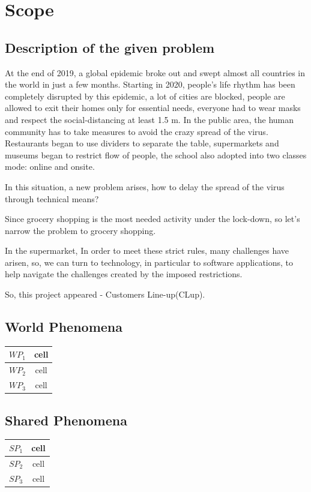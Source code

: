 \documentclass[a4paper,12pt]{report}
\begin{document}
\section{Scope}
\subsection{Description of the given problem}

At the end of 2019, a global epidemic broke out and swept almost all countries in the world in just a few months. Starting in 2020, people's life rhythm has been completely disrupted by this epidemic, a lot of cities are blocked, people are allowed to exit their homes only for essential needs, everyone had to wear masks and respect the social-distancing at least 1.5 m. In the public area, the human community has to take measures to avoid the crazy spread of the virus. Restaurants began to use dividers to separate the table, supermarkets and museums began to restrict flow of people, the school also adopted into two classes mode: online and onsite.

In this situation, a new problem arises, how to delay the spread of the virus through technical means? 

Since grocery shopping is the most needed activity under the lock-down, so let’s narrow the problem to grocery shopping.

In the supermarket, In order to meet these strict rules, many challenges have arisen, so, we can turn to technology, in particular to software applications, to help navigate the challenges created by the imposed restrictions.

So, this project appeared - Customers Line-up(CLup).

\subsection{World Phenomena}

\begin{center}
	\begin{tabular}{ c|c } 
		\hline
		$WP_1$ & cell \\ 
		\hline
		$WP_2$ & cell \\ 
		\hline
		$WP_3$ & cell \\ 
		\hline
	\end{tabular}
\end{center}

\subsection{Shared Phenomena}
\begin{center}
	\begin{tabular}{ c|c } 
		\hline
		$SP_1$ & cell \\ 
		\hline
		$SP_2$ & cell \\ 
		\hline
		$SP_3$ & cell \\ 
		\hline
	\end{tabular}
\end{center}
\end{document}
